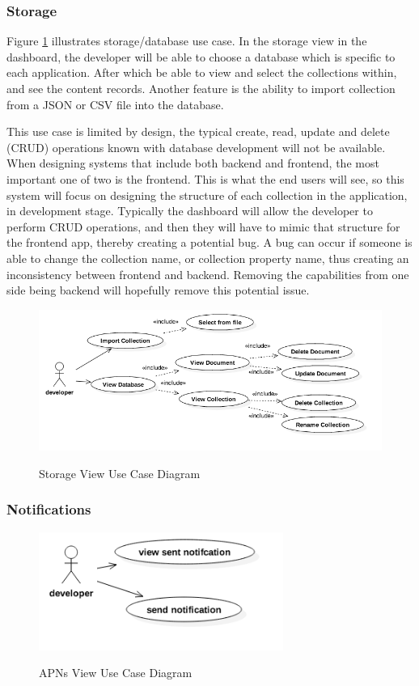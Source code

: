 \subsubsection{Storage}

Figure \ref{fig:storage_use_case} illustrates storage/database use case. In the storage view in the dashboard, the developer will be able to choose a database which is specific to each application. After which be able to view and select the collections within, and see the content records. Another feature is the ability to import collection from a JSON or CSV file into the database.

This use case is limited by design, the typical create, read, update and delete (CRUD) operations known with database development will not be available. When designing systems that include both backend and frontend, the most important one of two is the frontend. This is what the end users will see, so this system will focus on designing the structure of each collection in the application, in development stage. Typically the dashboard will allow the developer to perform CRUD operations, and then they will have to mimic that structure for the frontend app, thereby creating a potential bug. A bug can occur if someone is able to change the collection name, or collection property name, thus creating an inconsistency between frontend and backend. Removing the capabilities from one side being backend will hopefully remove this potential issue. 

\begin{figure}[!h]
    \caption{Storage View Use Case Diagram}
    \centering
    \includegraphics[width=120mm]{images/use_cases/storage_use_case}
    \label{fig:storage_use_case}
\end{figure}

\subsubsection{Notifications}

\begin{figure}[!h] 
    \caption{APNs View Use Case Diagram}
    \centering
    \includegraphics[width=80mm]{images/use_cases/notifications_uc}
    \label{fig:notifications_uc}
\end{figure}

